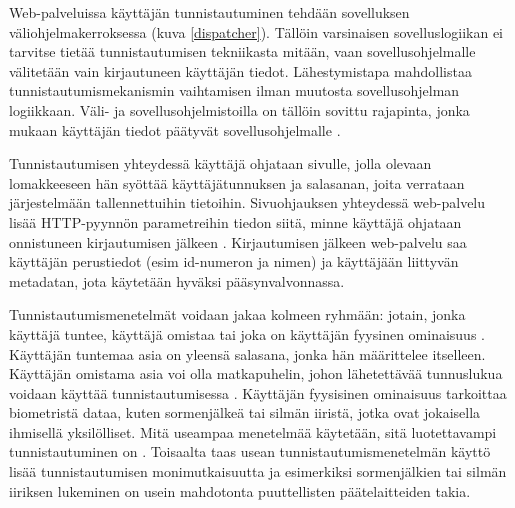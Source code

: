 Web-palveluissa käyttäjän tunnistautuminen tehdään sovelluksen väliohjelmakerroksessa (kuva \ref{dispatcher}). Tällöin varsinaisen sovelluslogiikan ei tarvitse tietää tunnistautumisen tekniikasta mitään, vaan sovellusohjelmalle välitetään vain kirjautuneen käyttäjän tiedot. Lähestymistapa mahdollistaa tunnistautumismekanismin vaihtamisen ilman muutosta sovellusohjelman logiikkaan. Väli- ja sovellusohjelmistoilla on tällöin sovittu rajapinta, jonka mukaan käyttäjän tiedot päätyvät sovellusohjelmalle \cite{django}.

Tunnistautumisen yhteydessä käyttäjä ohjataan sivulle, jolla olevaan lomakkeeseen hän syöttää käyttäjätunnuksen ja salasanan, joita verrataan järjestelmään tallennettuihin tietoihin. Sivuohjauksen yhteydessä web-palvelu lisää HTTP-pyynnön parametreihin tiedon siitä, minne käyttäjä ohjataan onnistuneen kirjautumisen jälkeen \cite{oauth2_0}. Kirjautumisen jälkeen web-palvelu saa käyttäjän perustiedot (esim id-numeron ja nimen) ja käyttäjään liittyvän metadatan, jota käytetään hyväksi pääsynvalvonnassa.

Tunnistautumismenetelmät voidaan jakaa kolmeen ryhmään: jotain, jonka käyttäjä tuntee, käyttäjä omistaa tai joka on käyttäjän fyysinen ominaisuus \cite{nisti}. Käyttäjän tuntemaa asia on yleensä salasana, jonka hän määrittelee itselleen. Käyttäjän omistama asia voi olla matkapuhelin, johon lähetettävää tunnuslukua voidaan käyttää tunnistautumisessa \cite{5336918}. Käyttäjän fyysisinen ominaisuus tarkoittaa biometristä dataa, kuten sormenjälkeä tai silmän iiristä, jotka ovat jokaisella ihmisellä yksilölliset. Mitä useampaa menetelmää käytetään, sitä luotettavampi tunnistautuminen on \cite{nisti}. Toisaalta taas usean tunnistautumismenetelmän käyttö lisää tunnistautumisen monimutkaisuutta ja esimerkiksi sormenjälkien tai silmän iiriksen lukeminen on usein mahdotonta puuttellisten päätelaitteiden takia.